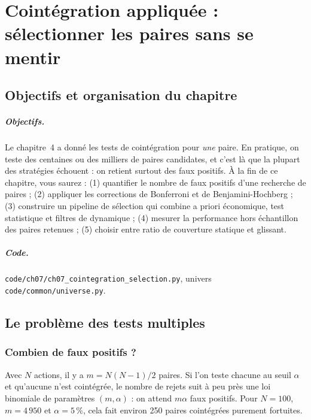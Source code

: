 \chapter{Cointégration appliquée : sélectionner les paires sans se mentir}
\label{ch:7}

\section{Objectifs et organisation du chapitre}

\paragraph{Objectifs.} Le chapitre~4 a donné les tests de cointégration pour \emph{une} paire. En pratique, on teste des centaines ou des milliers de paires candidates, et c'est là que la plupart des stratégies échouent : on retient surtout des faux positifs. À la fin de ce chapitre, vous saurez : (1) quantifier le nombre de faux positifs d'une recherche de paires ; (2) appliquer les corrections de Bonferroni et de Benjamini-Hochberg ; (3) construire un pipeline de sélection qui combine a priori économique, test statistique et filtres de dynamique \citep{vidyamurthy2004,huck2009,krauss2017survey} ; (4) mesurer la performance hors échantillon des paires retenues ; (5) choisir entre ratio de couverture statique et glissant.

\paragraph{Code.} \texttt{code/ch07/ch07\_cointegration\_selection.py}, univers \texttt{code/common/universe.py}.

\section{Le problème des tests multiples}

\subsection{Combien de faux positifs ?}

Avec $N$ actions, il y a $m = N(N-1)/2$ paires. Si l'on teste chacune au seuil $\alpha$ et qu'aucune n'est cointégrée, le nombre de rejets suit à peu près une loi binomiale de paramètres $(m,\alpha)$ : on attend $m\alpha$ faux positifs. Pour $N = 100$, $m = 4\,950$ et $\alpha = 5\,\%$, cela fait environ 250 \og paires cointégrées\fg{} purement fortuites.

